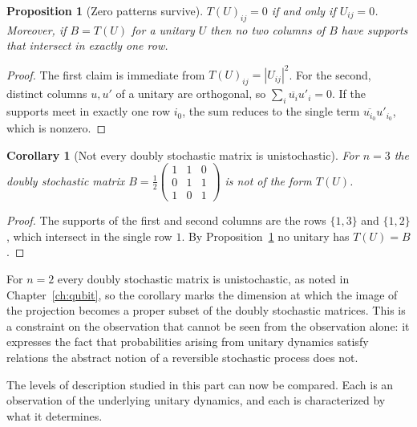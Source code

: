 \documentclass[11pt,oneside]{book}
\newtheorem{proposition}[theorem]{Proposition}
\newtheorem{corollary}[theorem]{Corollary}
\theoremstyle{definition}
\theoremstyle{remark}
\begin{document}
\begin{proposition}[Zero patterns survive]\label{prop:zeros}
$T(U)_{ij}=0$ if and only if $U_{ij}=0$. Moreover, if $B=T(U)$ for a unitary $U$ then no two columns of $B$ have supports that intersect in exactly one row.
\end{proposition}

\begin{proof}
The first claim is immediate from $T(U)_{ij}=|U_{ij}|^2$. For the second, distinct columns $u,u'$ of a unitary are orthogonal, so $\sum_i\overline{u_i}u'_i=0$. If the supports meet in exactly one row $i_0$, the sum reduces to the single term $\overline{u_{i_0}}u'_{i_0}$, which is nonzero.
\end{proof}

\begin{corollary}[Not every doubly stochastic matrix is unistochastic]\label{cor:notunistochastic}
For $n=3$ the doubly stochastic matrix $B=\tfrac12\begin{pmatrix}1&1&0\\0&1&1\\1&0&1\end{pmatrix}$ is not of the form $T(U)$.
\end{corollary}

\begin{proof}
The supports of the first and second columns are the rows $\{1,3\}$ and $\{1,2\}$, which intersect in the single row $1$. By Proposition~\ref{prop:zeros} no unitary has $T(U)=B$.
\end{proof}

For $n=2$ every doubly stochastic matrix is unistochastic, as noted in Chapter~\ref{ch:qubit}, so the corollary marks the dimension at which the image of the projection becomes a proper subset of the doubly stochastic matrices. This is a constraint on the observation that cannot be seen from the observation alone: it expresses the fact that probabilities arising from unitary dynamics satisfy relations the abstract notion of a reversible stochastic process does not.

The levels of description studied in this part can now be compared. Each is an observation of the underlying unitary dynamics, and each is characterized by what it determines.
\end{document}

